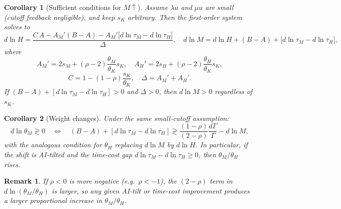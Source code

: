 \documentclass[english]{article}
\newtheorem{corollary}{Corollary}
\newtheorem{remark}{Remark}
\begin{document}
\begin{corollary}[Sufficient conditions for $M\uparrow$]\label{cor:Mup}
Assume $\lambda u$ and $\mu u$ are small (cutoff feedback negligible), and keep $s_K$ arbitrary. Then the first-order system solves to
\[
d\ln H=\frac{C\,A - A_M'(B-A) - A_M'\big[d\ln\tau_M - d\ln\tau_H\big]}{\Delta},\quad
d\ln M=d\ln H + (B-A) + \big[d\ln\tau_M - d\ln\tau_H\big],
\]
where 
\[
A_M'=2s_M+(\rho-2)\frac{\theta_M}{\theta_K}s_K,\quad
A_H'=2s_H+(\rho-2)\frac{\theta_H}{\theta_K}s_K,
\]
\[
C=1-(1-\rho)\frac{s_K}{\theta_K},\quad
\Delta = A_M' + A_H'.
\]
If $(B-A) + [d\ln\tau_M - d\ln\tau_H] > 0$ and $\Delta>0$, then $d\ln M>0$ regardless of $s_K$.
\end{corollary}

\begin{corollary}[Weight changes]\label{cor:weights}
Under the same small-cutoff assumption:
\[
d\ln\theta_M \gtrless 0 \quad\Longleftrightarrow\quad (B-A) + [d\ln\tau_M - d\ln\tau_H] \gtrless \frac{(1-\rho)}{(2-\rho)}\frac{d\Gamma}{\Gamma} - d\ln M,
\]
with the analogous condition for $\theta_H$ replacing $d\ln M$ by $d\ln H$.
In particular, if the shift is AI-tilted and the time-cost gap $d\ln\tau_M - d\ln\tau_H\ge0$, then $\theta_M/\theta_H$ rises.
\end{corollary}

\begin{remark}
If $\rho<0$ is more negative (e.g.\ $\rho<-1$), the $(2-\rho)$ term in $d\ln(\theta_M/\theta_H)$ is larger, so any given AI-tilt or time-cost improvement produces a larger proportional increase in $\theta_M/\theta_H$.
\end{remark}




\newpage
\end{document}
